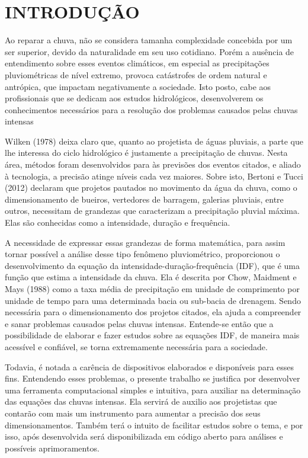 \onehalfspacing
\chapter{INTRODUÇÃO}

Ao reparar a chuva, não se considera tamanha complexidade concebida por um ser superior, devido da naturalidade em seu uso cotidiano. Porém a ausência de entendimento sobre esses eventos climáticos, em especial as precipitações pluviométricas de nível extremo, provoca catástrofes de ordem natural e antrópica, que impactam negativamente a sociedade. Isto posto, cabe aos profissionais que se dedicam aos estudos hidrológicos, desenvolverem os conhecimentos necessários para a resolução dos problemas causados pelas chuvas intensas

Wilken (1978) deixa claro que, quanto ao projetista de águas pluviais, a parte que lhe interessa do ciclo hidrológico é justamente a precipitação de chuvas. Nesta área, métodos foram desenvolvidos para às previsões dos eventos citados, e aliado à tecnologia, a precisão atinge níveis cada vez maiores. Sobre isto, Bertoni e Tucci (2012) declaram que projetos pautados no movimento da água da chuva, como o dimensionamento de bueiros, vertedores de barragem, galerias pluviais, entre outros, necessitam de grandezas que caracterizam a precipitação pluvial máxima. Elas são conhecidas como a intensidade, duração e frequência.

A necessidade de expressar essas grandezas de forma matemática, para assim tornar possível a análise desse tipo fenômeno pluviométrico, proporcionou o desenvolvimento da equação da intensidade-duração-frequência (IDF), que é uma função que estima a intensidade da chuva. Ela é descrita por Chow, Maidment e Mays (1988) como a taxa média de precipitação em unidade de comprimento por unidade de tempo para uma determinada bacia ou sub-bacia de drenagem. Sendo necessária para o dimensionamento dos projetos citados, ela ajuda a compreender e sanar problemas causados pelas chuvas intensas. Entende-se então que a possibilidade de elaborar e fazer estudos sobre as equações IDF, de maneira mais acessível e confiável, se torna extremamente necessária para a sociedade. 

Todavia, é notada a carência de dispositivos elaborados e disponíveis para esses fins. Entendendo esses problemas, o presente trabalho se justifica por desenvolver uma ferramenta computacional simples e intuitiva, para auxiliar na determinação das equações das chuvas intensas. Ela servirá de auxilio aos projetistas que contarão com mais um instrumento para aumentar a precisão dos seus dimensionamentos. Também terá o intuito de facilitar estudos sobre o tema, e por isso, após desenvolvida será disponibilizada em código aberto para análises e possíveis aprimoramentos.
 